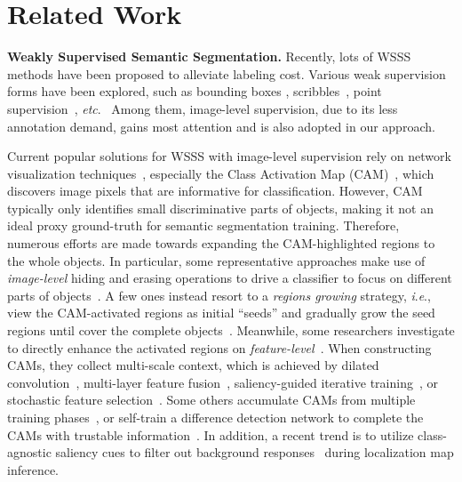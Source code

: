 \documentclass[runningheads]{llncs}
\newcommand{\ie}{\textit{i}.\textit{e}.}
\newcommand{\etc}{\textit{etc}.}
\begin{document}
\vspace{-5pt}
\section{Related Work}\label{sec:rw}
\vspace{-3pt}



\noindent\textbf{Weakly Supervised Semantic Segmentation.} Recently, lots of WSSS methods have been proposed to alleviate labeling cost. Various weak supervision forms have been explored, such
as bounding boxes \cite{papandreou2015weakly, dai2015boxsup}, scribbles~\cite{lin2016scribblesup}, point supervision~\cite{bearman2016s}, \etc~ Among them, image-level supervision, due to its less annotation demand, gains most attention and is also adopted in our approach.

Current popular solutions for WSSS with image-level supervision rely on network visualization techniques~\cite{zeiler2014visualizing,cam2016learning}, especially the Class Activation Map (CAM)~\cite{cam2016learning}, which discovers image pixels that are informative for classification. However, CAM typically only identifies small discriminative parts of objects, making it not an ideal proxy ground-truth for  semantic segmentation training. Therefore, numerous efforts are made towards expanding the CAM-highlighted regions to the whole objects. In particular, some representative approaches make use of \textit{image-level} hiding and erasing operations to drive a classifier to focus on different parts of objects~\cite{li2018tell,kumar2017hide,wei2017object}.
A few ones instead resort to a \textit{regions growing} strategy, \ie, view the CAM-activated regions as initial ``seeds'' and gradually grow the seed regions until cover the complete objects~\cite{sec2016,wang2018weakly,dsrg2018,psa2018}. Meanwhile, some researchers
investigate to directly enhance the activated regions on \textit{feature-level}~\cite{wei2018revisiting,lee2018robust,lee2019ficklenet}. When constructing CAMs, they collect multi-scale context, which is achieved by dilated convolution~\cite{wei2018revisiting}, multi-layer feature fusion~\cite{lee2018robust}, saliency-guided iterative training~\cite{wang2018weakly}, or stochastic feature selection~\cite{lee2019ficklenet}. Some others accumulate CAMs from multiple training phases~\cite{oaa2019}, or self-train a difference detection network to complete the CAMs with trustable information~\cite{ssdd2019}. In addition, a recent trend is to utilize class-agnostic saliency cues to filter out background responses~\cite{wei2017object,dsrg2018,wang2018weakly,li2018tell,wei2018revisiting,lee2019ficklenet,fan2020cian} during localization map inference.\!\!
\end{document}
